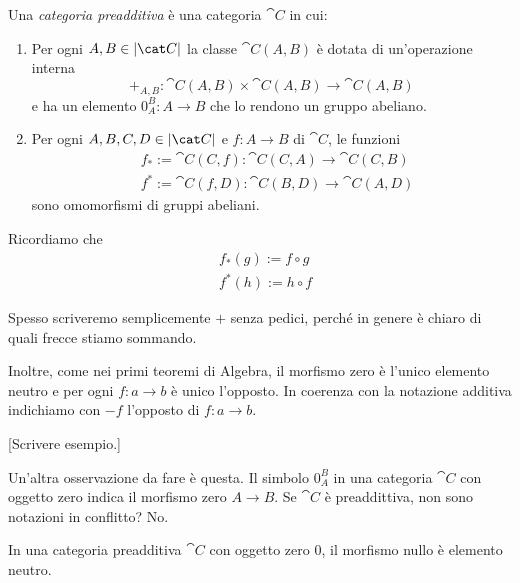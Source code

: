 \begin{definition}
  Una {\em categoria preadditiva} è una categoria \(\cat C\) in cui:
  \begin{enumerate}[leftmargin=*]
  \item Per ogni \(A, B \in \obj{\cat C}\) la classe \(\cat C(A, B)\) è
    dotata di un'operazione interna
    \[
      +_{A,B} : \cat C (A, B) \times \cat C (A, B) \to \cat C (A, B)
    \]
    e ha un elemento \(0_A^B : A \to B\) che lo rendono un gruppo
    abeliano.
  \item Per ogni \(A, B, C, D \in \obj{\cat C}\) e \(f : A \to B\) di
    \(\cat C\), le funzioni
    \begin{align*}
      & f_\ast := \cat C(C, f) : \cat C(C, A) \to \cat C(C, B) \\
      & f^\ast := \cat C(f, D) : \cat C(B, D) \to \cat C(A, D)
    \end{align*}
    sono omomorfismi di gruppi abeliani.
  \end{enumerate}
\end{definition}

\begin{recall}
  Ricordiamo che
  \begin{align*}
    & f_\ast(g) := f \circ g \\
    & f^\ast(h) := h \circ f
  \end{align*}
\end{recall}

Spesso scriveremo semplicemente \(+\) senza pedici, perché in genere è
chiaro di quali frecce stiamo sommando.

Inoltre, come nei primi teoremi di Algebra, il morfismo zero è l'unico
elemento neutro e per ogni \(f : a \to b\) è unico l'opposto. In
coerenza con la notazione additiva indichiamo con \(- f\) l'opposto di
\(f : a \to b\).

\begin{example}[\(\Modu_R\)] {\color{red} [Scrivere esempio.]}
\end{example}

Un'altra osservazione da fare è questa. Il simbolo \(0_A^B\) in una
categoria \(\cat C\) con oggetto zero indica il morfismo zero
\(A \to B\). Se \(\cat C\) è preaddittiva, non sono notazioni in
conflitto?  No.

\begin{proposition}
  In una categoria preadditiva \(\cat C\) con oggetto zero \(0\), il
  morfismo nullo è elemento neutro.
\end{proposition}

